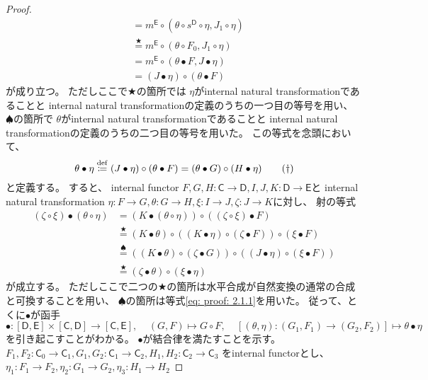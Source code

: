 \documentclass[uplatex]{jsarticle}
\theoremstyle{definition}
\def\msC{\mathsf{C}}
\def\msD{\mathsf{D}}
\def\msE{\mathsf{E}}
\newcommand{\dfn}{\overset{\mathrm{\tiny def}}{\coloneqq}}
\begin{document}
\begin{proof}
\begin{align*}
    &= m^{\msE} \circ (\theta \circ s^{\msD}\circ \eta, J_1\circ \eta) \\
    &\overset{\bigstar}{=}
    m^{\msE} \circ (\theta \circ F_0 , J_1\circ \eta) \\
    &= m^{\msE} \circ (\theta \bullet F , J \bullet \eta) \\
    &= (J \bullet \eta) \circ (\theta \bullet F)
  \end{align*}
  が成り立つ。
  ただしここで\(\bigstar\)の箇所では
  \(\eta\)がinternal natural transformationであることと
  internal natural transformationの定義のうちの一つ目の等号を用い、
  \(\spadesuit\)の箇所で
  \(\theta\)がinternal natural transformationであることと
  internal natural transformationの定義のうちの二つ目の等号を用いた。
  この等式を念頭において、
  \begin{equation*}
    \label{eq: proof: 2.1.1}
    \theta \bullet \eta \dfn
    (J \bullet \eta) \circ (\theta \bullet F) =
    (\theta \bullet G) \circ (H \bullet \eta)
    \tag{\(\dagger\)}
  \end{equation*}
  と定義する。
  すると、
  internal functor
  \(F,G,H:\msC\to \msD, I,J,K:\msD\to \msE\)と
  internal natural transformation
  \(\eta:F\to G, \theta:G\to H, \xi:I\to J, \zeta: J\to K\)に対し、
  射の等式
  \begin{align*}
    (\zeta \circ \xi) \bullet (\theta \circ \eta)
    &= (K \bullet (\theta \circ \eta)) \circ ((\zeta \circ \xi) \bullet F) \\
    &\overset{\bigstar}{=}
    (K \bullet\theta) \circ ((K\bullet\eta) \circ (\zeta\bullet F)) \circ (\xi\bullet F) \\
    &\overset{\spadesuit}{=}
    ((K \bullet\theta) \circ (\zeta\bullet G)) \circ ((J\bullet\eta) \circ (\xi\bullet F)) \\
    &\overset{\bigstar}{=}
    (\zeta \bullet \theta) \circ (\xi \bullet \eta)
  \end{align*}
  が成立する。
  ただしここで二つの\(\bigstar\)の箇所は水平合成が自然変換の通常の合成と可換することを用い、
  \(\spadesuit\)の箇所は等式\eqref{eq: proof: 2.1.1}を用いた。
  従って、とくに\(\bullet\)が函手
  \[
  \bullet: [\msD,\msE]\times [\msC,\msD] \to [\msC,\msE], \ \ \ \ \
  (G,F) \mapsto G\circ F, \ \ \ \ \
  [(\theta,\eta):(G_1,F_1)\to (G_2,F_2)] \mapsto \theta\bullet\eta
  \]
  を引き起こすことがわかる。
  \(\bullet\)が結合律を満たすことを示す。
  \(F_1,F_2:\msC_0\to\msC_1, G_1,G_2:\msC_1\to\msC_2, H_1,H_2:\msC_2\to\msC_3\)
  をinternal functorとし、
  \(\eta_1:F_1\to F_2, \eta_2:G_1\to G_2, \eta_3:H_1\to H_2\)

\end{proof}
\end{document}
